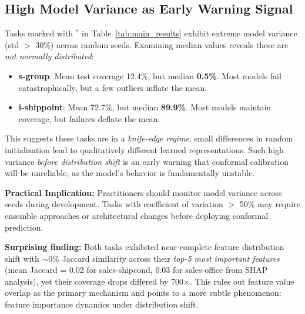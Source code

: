 \subsection{High Model Variance as Early Warning Signal}

Tasks marked with $^*$ in Table~\ref{tab:main_results} exhibit extreme model
variance (std $>$ 30\%) across random seeds. Examining median values reveals
these are \textit{not normally distributed}:

\begin{itemize}
    \item \textbf{s-group}: Mean test coverage 12.4\%, but median \textbf{0.5\%}.
    Most models fail catastrophically, but a few outliers inflate the mean.

    \item \textbf{i-shippoint}: Mean 72.7\%, but median \textbf{89.9\%}.
    Most models maintain coverage, but failures deflate the mean.
\end{itemize}

This suggests these tasks are in a \textit{knife-edge regime}: small differences
in random initialization lead to qualitatively different learned representations.
Such high variance \textit{before distribution shift} is an early warning that
conformal calibration will be unreliable, as the model's behavior is fundamentally unstable.

\textbf{Practical Implication:} Practitioners should monitor model variance
across seeds during development. Tasks with coefficient of variation $>$ 50\%
may require ensemble approaches or architectural changes before deploying
conformal prediction.



\textbf{Surprising finding:} Both tasks exhibited near-complete feature
distribution shift with $\sim$0\% Jaccard similarity across their
\textit{top-5 most important features} (mean Jaccard = 0.02 for sales-shipcond,
0.03 for sales-office from SHAP analysis), yet their coverage drops differed
by 700$\times$. This rules out feature value overlap as the primary mechanism
and points to a more subtle phenomenon: feature importance dynamics under
distribution shift.

